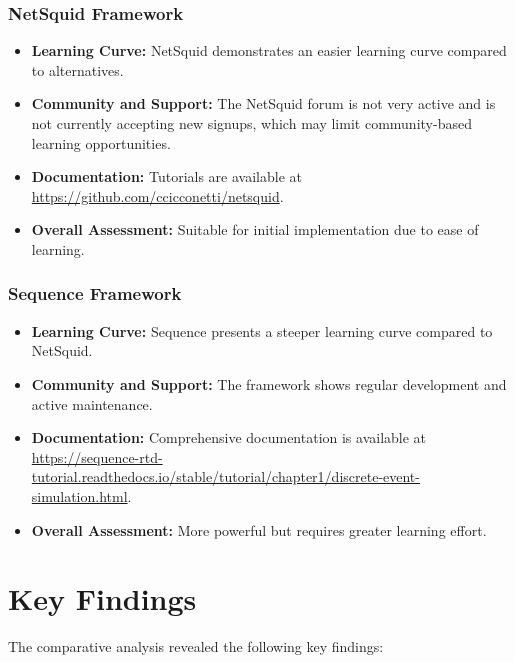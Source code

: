 \subsubsection{NetSquid Framework}

\begin{itemize}
    \item \textbf{Learning Curve:} NetSquid demonstrates an easier learning curve compared to alternatives.
    \item \textbf{Community and Support:} The NetSquid forum is not very active and is not currently accepting new signups, which may limit community-based learning opportunities.
    \item \textbf{Documentation:} Tutorials are available at \url{https://github.com/ccicconetti/netsquid}.
    \item \textbf{Overall Assessment:} Suitable for initial implementation due to ease of learning.
\end{itemize}

\subsubsection{Sequence Framework}

\begin{itemize}
    \item \textbf{Learning Curve:} Sequence presents a steeper learning curve compared to NetSquid.
    \item \textbf{Community and Support:} The framework shows regular development and active maintenance.
    \item \textbf{Documentation:} Comprehensive documentation is available at \url{https://sequence-rtd-tutorial.readthedocs.io/stable/tutorial/chapter1/discrete-event-simulation.html}.
    \item \textbf{Overall Assessment:} More powerful but requires greater learning effort.
\end{itemize}

\section{Key Findings}

The comparative analysis revealed the following key findings:

